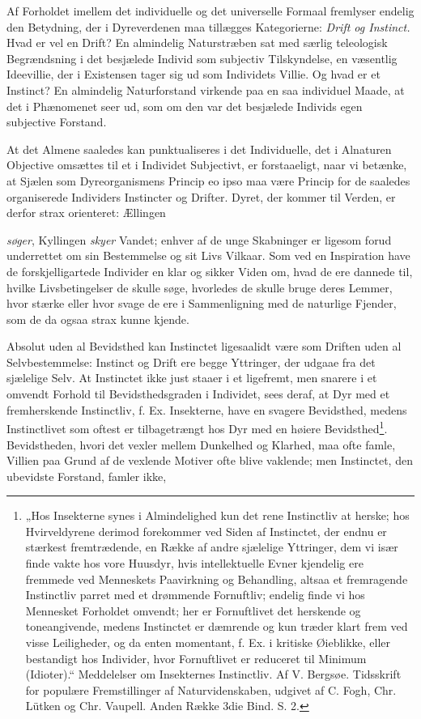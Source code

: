 \documentclass[12pt,a4paper]{book}
\begin{document}
Af Forholdet imellem det individuelle og det universelle Formaal fremlyser
endelig den Betydning, der i Dyreverdenen maa tillægges Kategorierne:
\emph{Drift og Instinct.} Hvad er vel en Drift? En almindelig Naturstræben sat
med særlig teleologisk Begrændsning i det besjælede Individ som subjectiv
Tilskyndelse, en væsentlig Ideevillie, der i Existensen tager sig ud som
Individets Villie. Og hvad er et Instinct? En almindelig Naturforstand virkende
paa en saa individuel Maade, at det i Phænomenet seer ud, som om den var det
besjælede Individs egen subjective Forstand.

At det Almene saaledes kan punktualiseres i det Individuelle, det i Alnaturen
Objective omsættes til et i Individet Subjectivt, er forstaaeligt, naar vi
betænke, at Sjælen som Dyreorganismens Princip eo ipso maa være Princip for de
saaledes organiserede Individers Instincter og Drifter. Dyret, der kommer til
Verden, er derfor strax orienteret: Ællingen

\setcounter{footnote}{0}
\emph{søger}, Kyllingen \emph{skyer} Vandet; enhver af de unge Skabninger er
ligesom forud underrettet om sin Bestemmelse og sit Livs Vilkaar. Som ved en
Inspiration have de forskjelligartede Individer en klar og sikker Viden om, hvad
de ere dannede til, hvilke Livsbetingelser de skulle søge, hvorledes de skulle
bruge deres Lemmer, hvor stærke eller hvor svage de ere i Sammenligning med de
naturlige Fjender, som de da ogsaa strax kunne kjende.

Absolut uden al Bevidsthed kan Instinctet ligesaalidt være som Driften uden al
Selvbestemmelse: Instinct og Drift ere begge Yttringer, der udgaae fra det
sjælelige Selv. At Instinctet ikke just staaer i et ligefremt, men snarere i et
omvendt Forhold til Bevidsthedsgraden i Individet, sees deraf, at Dyr med et
fremherskende Instinctliv, f. Ex. Insekterne, have en svagere Bevidsthed, medens
Instinctlivet som oftest er tilbagetrængt hos Dyr med en høiere
Bevidsthed\footnote{„Hos Insekterne synes i Almindelighed kun det rene
Instinctliv at herske; hos Hvirveldyrene derimod forekommer ved Siden af
Instinctet, der endnu er stærkest fremtrædende, en Række af andre sjælelige
Yttringer, dem vi især finde vakte hos vore Huusdyr, hvis intellektuelle Evner
kjendelig ere fremmede ved Menneskets Paavirkning og Behandling, altsaa et
fremragende Instinctliv parret med et drømmende Fornuftliv; endelig finde vi hos
Mennesket Forholdet omvendt; her er Fornuftlivet det herskende og toneangivende,
medens Instinctet er dæmrende og kun træder klart frem ved visse Leiligheder, og
da enten momentant, f. Ex. i kritiske Øieblikke, eller bestandigt hos Individer,
hvor Fornuftlivet er reduceret til Minimum (Idioter).“ Meddelelser om
Insekternes Instinctliv. Af V. Bergsøe. Tidsskrift for populære Fremstillinger
af Naturvidenskaben, udgivet af C. Fogh, Chr. Lütken og Chr. Vaupell. Anden
Række 3die Bind. S. 2.}. Bevidstheden, hvori det vexler mellem Dunkelhed og
Klarhed, maa ofte famle, Villien paa Grund af de vexlende Motiver ofte blive
vaklende; men Instinctet, den ubevidste Forstand, famler ikke,
\end{document}
